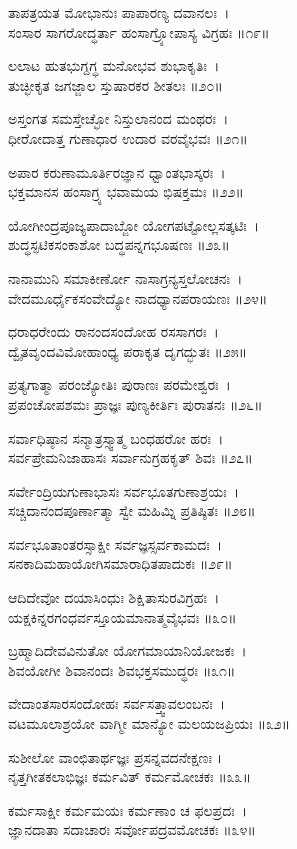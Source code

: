 	ತಾಪತ್ರಯತ ಮೋಭಾನುಃ ಪಾಪಾರಣ್ಯ ದವಾನಲಃ~।\\
	ಸಂಸಾರ ಸಾಗರೋದ್ಧರ್ತಾ ಹಂಸಾಗ್ರ್ಯೋಪಾಸ್ಯ ವಿಗ್ರಹಃ ॥೧೯॥

ಲಲಾಟ ಹುತಭುಗ್ದಗ್ಧ ಮನೋಭವ ಶುಭಾಕೃತಿಃ~।\\
ತುಚ್ಛೀಕೃತ ಜಗಜ್ಜಾಲ ಸ್ತುಷಾರಕರ ಶೀತಲಃ ॥೨೦॥

	ಅಸ್ತಂಗತ ಸಮಸ್ತೇಚ್ಛೋ ನಿಸ್ತುಲಾನಂದ ಮಂಥರಃ~।\\
	ಧೀರೋದಾತ್ತ ಗುಣಾಧಾರ ಉದಾರ ವರವೈಭವಃ ॥೨೧॥

ಅಪಾರ ಕರುಣಾಮೂರ್ತಿರಜ್ಞಾನ ಧ್ವಾಂತಭಾಸ್ಕರಃ~।\\
ಭಕ್ತಮಾನಸ ಹಂಸಾಗ್ರ್ಯ ಭವಾಮಯ ಭಿಷಕ್ತಮಃ ॥೨೨॥

	ಯೋಗೀಂದ್ರಪೂಜ್ಯಪಾದಾಬ್ಜೋ ಯೋಗಪಟ್ಟೋಲ್ಲಸತ್ಕಟಿಃ~।\\
	ಶುದ್ಧಸ್ಫಟಿಕಸಂಕಾಶೋ ಬದ್ಧಪನ್ನಗಭೂಷಣಃ ॥೨೩॥

ನಾನಾಮುನಿ ಸಮಾಕೀರ್ಣೋ ನಾಸಾಗ್ರನ್ಯಸ್ತಲೋಚನಃ~।\\
ವೇದಮೂರ್ಧೈಕಸಂವೇದ್ಯೋ ನಾದಧ್ಯಾನಪರಾಯಣಃ ॥೨೪॥

	ಧರಾಧರೇಂದು ರಾನಂದಸಂದೋಹ ರಸಸಾಗರಃ~।\\
	ದ್ವೈತವೃಂದವಿಮೋಹಾಂಧ್ಯ ಪರಾಕೃತ ದೃಗದ್ಭುತಃ ॥೨೫॥

ಪ್ರತ್ಯಗಾತ್ಮಾ ಪರಂಜ್ಯೋತಿಃ ಪುರಾಣಃ ಪರಮೇಶ್ವರಃ~।\\
ಪ್ರಪಂಚೋಪಶಮಃ ಪ್ರಾಜ್ಞಃ ಪುಣ್ಯಕೀರ್ತಿಃ ಪುರಾತನಃ ॥೨೬॥

	ಸರ್ವಾಧಿಷ್ಠಾನ ಸನ್ಮಾತ್ರಸ್ಸ್ವಾತ್ಮ ಬಂಧಹರೋ ಹರಃ~।\\
	ಸರ್ವಪ್ರೇಮನಿಜಾಹಾಸಃ ಸರ್ವಾನುಗ್ರಹಕೃತ್ ಶಿವಃ ॥೨೭॥

ಸರ್ವೇಂದ್ರಿಯಗುಣಾಭಾಸಃ ಸರ್ವಭೂತಗುಣಾಶ್ರಯಃ~।\\
ಸಚ್ಚಿದಾನಂದಪೂರ್ಣಾತ್ಮಾ ಸ್ವೇ ಮಹಿಮ್ನಿ ಪ್ರತಿಷ್ಠಿತಃ ॥೨೮॥

	ಸರ್ವಭೂತಾಂತರಸ್ಸಾಕ್ಷೀ ಸರ್ವಜ್ಞಸ್ಸರ್ವಕಾಮದಃ~।\\
	ಸನಕಾದಿಮಹಾಯೋಗಿಸಮಾರಾಧಿತಪಾದುಕಃ ॥೨೯॥

ಆದಿದೇವೋ ದಯಾಸಿಂಧುಃ ಶಿಕ್ಷಿತಾಸುರವಿಗ್ರಹಃ~।\\
ಯಕ್ಷಕಿನ್ನರಗಂಧರ್ವಸ್ತೂಯಮಾನಾತ್ಮವೈಭವಃ ॥೩೦॥

	ಬ್ರಹ್ಮಾದಿದೇವವಿನುತೋ ಯೋಗಮಾಯಾನಿಯೋಜಕಃ~।\\
	ಶಿವಯೋಗೀ ಶಿವಾನಂದಃ ಶಿವಭಕ್ತಸಮುದ್ಧರಃ ॥೩೧॥

ವೇದಾಂತಸಾರಸಂದೋಹಃ ಸರ್ವಸತ್ತ್ವಾವಲಂಬನಃ~।\\
ವಟಮೂಲಾಶ್ರಯೋ ವಾಗ್ಮೀ ಮಾನ್ಯೋ ಮಲಯಜಪ್ರಿಯಃ ॥೩೨॥

	ಸುಶೀಲೋ ವಾಂಛಿತಾರ್ಥಜ್ಞಃ ಪ್ರಸನ್ನವದನೇಕ್ಷಣಃ ।\\
	ನೃತ್ತಗೀತಕಲಾಭಿಜ್ಞಃ ಕರ್ಮವಿತ್ ಕರ್ಮಮೋಚಕಃ ॥೩೩॥

ಕರ್ಮಸಾಕ್ಷೀ ಕರ್ಮಮಯಃ ಕರ್ಮಣಾಂ ಚ ಫಲಪ್ರದಃ~।\\
ಜ್ಞಾನದಾತಾ ಸದಾಚಾರಃ ಸರ್ವೋಪದ್ರವಮೋಚಕಃ ॥೩೪॥

